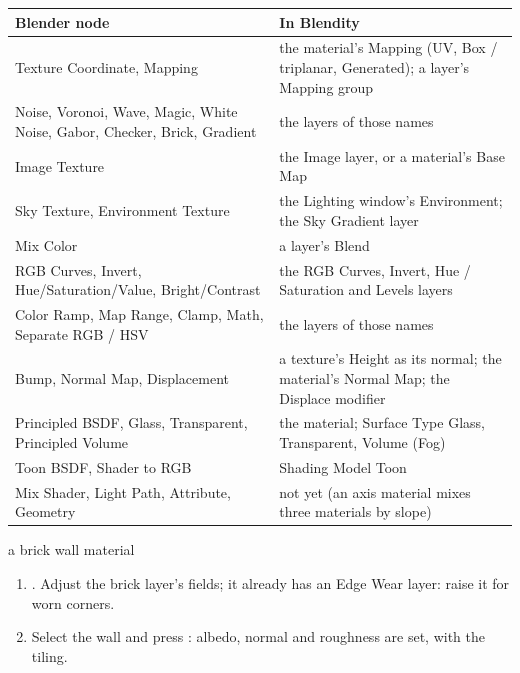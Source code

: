 \begin{center}
\small
\begin{tabularx}{\textwidth}{lX}
\toprule
Blender node & In Blendity \\
\midrule
Texture Coordinate, Mapping & the material's Mapping (UV, Box / triplanar, Generated); a layer's Mapping group \\
Noise, Voronoi, Wave, Magic, White Noise, Gabor, Checker, Brick, Gradient & the layers of those names \\
Image Texture & the Image layer, or a material's Base Map \\
Sky Texture, Environment Texture & the Lighting window's Environment; the Sky Gradient layer \\
Mix Color & a layer's Blend \\
RGB Curves, Invert, Hue/Saturation/Value, Bright/Contrast & the RGB Curves, Invert, Hue / Saturation and Levels layers \\
Color Ramp, Map Range, Clamp, Math, Separate RGB / HSV & the layers of those names \\
Bump, Normal Map, Displacement & a texture's Height as its normal; the material's Normal Map; the Displace modifier \\
Principled BSDF, Glass, Transparent, Principled Volume & the material; Surface Type Glass, Transparent, Volume (Fog) \\
Toon BSDF, Shader to RGB & Shading Model Toon \\
Mix Shader, Light Path, Attribute, Geometry & not yet (an axis material mixes three materials by slope) \\
\bottomrule
\end{tabularx}
\end{center}

\begin{example}{a brick wall material}
\begin{enumerate}
  \item {}. Adjust the brick layer's fields; it already has an Edge Wear layer:
    raise it for worn corners.
  \item Select the wall and press : albedo, normal and roughness are set, with the tiling.
\end{enumerate}
\end{example}


